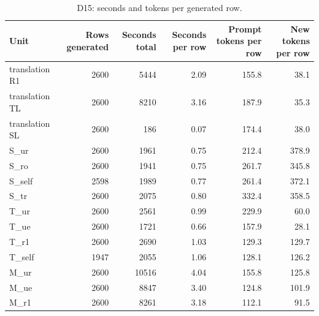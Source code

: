 \begin{table}[t]
\centering
\small
\caption{D15: seconds and tokens per generated row.}
\label{tab:d15-cost}
\begin{tabular}{lrrrrr}
\toprule
Unit & Rows generated & Seconds total & Seconds per row & Prompt tokens per row & New tokens per row \\
\midrule
translation R1 & 2600 & 5444 & 2.09 & 155.8 & 38.1 \\
translation TL & 2600 & 8210 & 3.16 & 187.9 & 35.3 \\
translation SL & 2600 & 186 & 0.07 & 174.4 & 38.0 \\
S\_ur & 2600 & 1961 & 0.75 & 212.4 & 378.9 \\
S\_ro & 2600 & 1941 & 0.75 & 261.7 & 345.8 \\
S\_self & 2598 & 1989 & 0.77 & 261.4 & 372.1 \\
S\_tr & 2600 & 2075 & 0.80 & 332.4 & 358.5 \\
T\_ur & 2600 & 2561 & 0.99 & 229.9 & 60.0 \\
T\_ue & 2600 & 1721 & 0.66 & 157.9 & 28.1 \\
T\_r1 & 2600 & 2690 & 1.03 & 129.3 & 129.7 \\
T\_self & 1947 & 2055 & 1.06 & 128.1 & 126.2 \\
M\_ur & 2600 & 10516 & 4.04 & 155.8 & 125.8 \\
M\_ue & 2600 & 8847 & 3.40 & 124.8 & 101.9 \\
M\_r1 & 2600 & 8261 & 3.18 & 112.1 & 91.5 \\
\bottomrule
\end{tabular}
\end{table}
